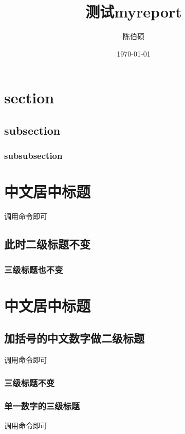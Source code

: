\documentclass[pdfCover]{myreport} %
\title{测试myreport}
\author{陈伯硕}
\date{\today}
\begin{document}
\maketitle

\begin{center}
	\tableofcontents
\end{center}
\newpage
\setcounter{page}{1}

\section{section}
\subsection{subsection}
\subsubsection{subsubsection}

\cheineseCenterSection
\section{中文居中标题}
	调用命令即可
	\subsection{此时二级标题不变}
		\subsubsection{三级标题也不变}

\section{中文居中标题}
		\chineseSubsection
		\subsection{加括号的中文数字做二级标题}
			调用命令即可
			\subsubsection{三级标题不变}

		\singleArabicSubsubsection
		\subsubsection{单一数字的三级标题}
			调用命令即可
\end{document}
